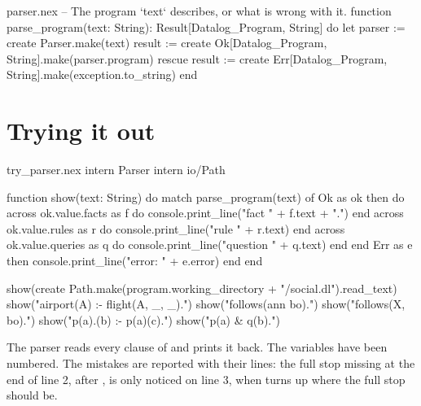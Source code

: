 \begin{continued}{parser.nex}
-- The program `text` describes, or what is wrong with it.
function parse_program(text: String): Result[Datalog_Program, String]
do
  let parser := create Parser.make(text)
  result := create Ok[Datalog_Program, String].make(parser.program)
rescue
  result := create Err[Datalog_Program, String].make(exception.to_string)
end
\end{continued}

\section{Trying it out}

\begin{tryit}{try_parser.nex}
intern Parser
intern io/Path

function show(text: String)
do
  match parse_program(text) of
    Ok as ok then
      do
        across ok.value.facts as f do
          console.print_line("fact      " + f.text + ".")
        end
        across ok.value.rules as r do
          console.print_line("rule      " + r.text)
        end
        across ok.value.queries as q do
          console.print_line("question  " + q.text)
        end
      end
    Err as e then console.print_line("error: " + e.error)
  end
end

show(create Path.make(program.working_directory + "/social.dl").read_text)
show("airport(A) :- flight(A, _, _).")
show("follows(ann bo).")
show("follows(X, bo).")
show("p(a).\nq(b) :- p(a)\nr(c).")
show("p(a) & q(b).")
\end{tryit}

The parser reads every clause of  and prints it back. The
\code{_} variables have been numbered. The mistakes are reported with their
lines: the full stop missing at the end of line 2, after
, is only noticed on line 3, when  turns up
where the full stop should be.
